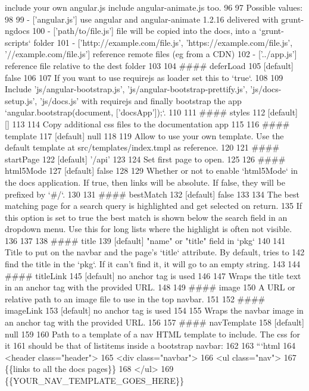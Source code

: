 \begin{DoxyCodeInclude}
       include your own angular.js include angular-animate.js too.
96 
97 Possible values:
98 
99   - ['angular.js'] use angular and angular-animate 1.2.16 delivered with grunt-ngdocs
100   - ['path/to/file.js'] file will be copied into the docs, into a `grunt-scripts` folder
101   - ['http://example.com/file.js', 'https://example.com/file.js', '//example.com/file.js'] reference remote
       files (eg from a CDN)
102   - ['../app.js'] reference file relative to the dest folder
103 
104 #### deferLoad
105 [default] false
106 
107 If you want to use requirejs as loader set this to `true`.
108 
109 Include 'js/angular-bootstrap.js', 'js/angular-bootstrap-prettify.js', 'js/docs-setup.js', 'js/docs.js'
       with requirejs and finally bootstrap the app `angular.bootstrap(document, ['docsApp']);`.
110 
111 #### styles
112 [default] []
113 
114 Copy additional css files to the documentation app
115 
116 #### template
117 [default] null
118 
119 Allow to use your own template. Use the default template at src/templates/index.tmpl as reference.
120 
121 #### startPage
122 [default] '/api'
123 
124 Set first page to open.
125 
126 #### html5Mode
127 [default] false
128 
129 Whether or not to enable `html5Mode` in the docs application.  If true, then links will be absolute.  If
       false, they will be prefixed by `#/`.
130 
131 #### bestMatch
132 [default] false
133 
134 The best matching page for a search query is highlighted and get selected on return.
135 If this option is set to true the best match is shown below the search field in an dropdown menu. Use this
       for long lists where the highlight is often not visible.
136 
137 
138 #### title
139 [default] "name" or "title" field in `pkg`
140 
141 Title to put on the navbar and the page's `title` attribute.  By default, tries to
142 find the title in the `pkg`. If it can't find it, it will go to an empty string.
143 
144 #### titleLink
145 [default] no anchor tag is used
146 
147 Wraps the title text in an anchor tag with the provided URL.
148 
149 #### image
150 A URL or relative path to an image file to use in the top navbar.
151 
152 #### imageLink
153 [default] no anchor tag is used
154 
155 Wraps the navbar image in an anchor tag with the provided URL.
156 
157 #### navTemplate
158 [default] null
159 
160 Path to a template of a nav HTML template to include.  The css for it
161 should be that of listitems inside a bootstrap navbar:
162 
163 ```html
164 <header class="header">
165   <div class="navbar">
166     <ul class="nav">
167       \{\{links to all the docs pages\}\}
168     </ul>
169     \{\{YOUR\_NAV\_TEMPLATE\_GOES\_HERE\}\}

\end{DoxyCodeInclude}
